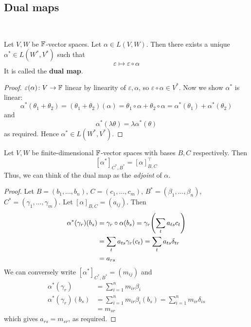\documentclass[a4paper]{article}
\begin{document}
\subsection{Dual maps}\ \vspace{-1.5em}
\begin{lemma}
	Let \( V, W \) be \( {\mathbb{F}} \)-vector spaces.
	Let \( \alpha \in L(V,W) \).
	Then there exists a unique \( \alpha^* \in L(W^*, V^*) \) such that
	\[
		\varepsilon \mapsto \varepsilon \circ \alpha
	\]
	It is called the \textbf{dual map}.
\end{lemma}
\begin{proof}
	\( \varepsilon(\alpha) \colon V \to {\mathbb{F}} \) linear by linearity of $ \varepsilon, \alpha $,	so \( \varepsilon \circ \alpha \in V^* \).
	Now we show \( \alpha^* \) is linear:
	\[
		\alpha^*(\theta_1 + \theta_2) = (\theta_1 + \theta_2)(\alpha) = \theta_1 \circ \alpha + \theta_2 \circ \alpha = \alpha^*(\theta_1) + \alpha^*(\theta_2)
	\]
	and
	\[
		\alpha^*(\lambda \theta) = \lambda \alpha^*(\theta)
	\]
	as required.
	Hence \( \alpha^* \in L(W^*, V^*) \).
\end{proof}
\begin{proposition}
	Let \( V, W \) be finite-dimensional \( {\mathbb{F}} \)-vector spaces with bases \( B, C \) respectively.
	Then
	\[
		[\alpha^*]_{C^*, B^*} = [\alpha]^\top_{B, C}
	\]
	Thus, we can think of the dual map as the \textit{adjoint} of \( \alpha \).
\end{proposition}
\begin{proof}
	Let \( B = (b_1, \dots, b_n) \), \( C = (c_1, \dots, c_m) \), \( B^* = (\beta_1, \dots, \beta_n) \), \( C^* = (\gamma_1, \dots, \gamma_m) \).
	Let \( [\alpha]_{B,C} = (a_{ij}) \).
	Then
	\begin{align*}
		\alpha^*(\gamma_r)(b_s) & = \gamma_r \circ \alpha(b_s)= \gamma_r \qty( \sum_t a_{ts} c_t ) \\
		                            & = \sum_t a_{ts} \gamma_r(c_t) = \sum_t a_{ts} \delta_{tr}          \\
		                            & = a_{rs}
	\end{align*}
	We can conversely write \( [\alpha^*]_{C^*, B^*} = (m_{ij}) \) and
	\begin{align*}
		\alpha^*(\gamma_r)      & = \sum_{i=1}^n m_{ir} \beta_i      \\
		\alpha^*(\gamma_r)(b_s) & = \sum_{i=1}^n m_{ir} \beta_i(b_s)= \sum_{i=1}^n m_{ir} \delta_{is}  \\
		                            & = m_{sr}
	\end{align*}
	which gives $ a_{rs} = m_{sr} $, as required.
\end{proof}
\end{document}
